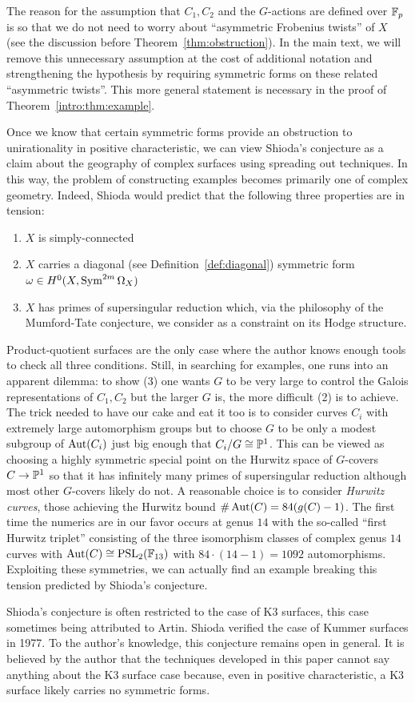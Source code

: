 \documentclass[main.tex]{subfiles}
\begin{document}
The reason for the assumption that $C_1, C_2$ and the $G$-actions are defined over $\FF_p$ is so that we do not need to worry about ``asymmetric Frobenius twists'' of $X$ (see the discussion before Theorem~\ref{thm:obstruction}). In the main text, we will remove this unnecessary assumption at the cost of additional notation and strengthening the hypothesis by requiring symmetric forms on these related ``asymmetric twists''. This more general statement is necessary in the proof of Theorem~\ref{intro:thm:example}.
\par 
Once we know that certain symmetric forms provide an obstruction to unirationality in positive characteristic, we can view Shioda's conjecture as a claim about the geography of complex surfaces using spreading out techniques. In this way, the problem of constructing examples becomes primarily one of complex geometry. Indeed, Shioda would predict that the following three properties are in tension:
\begin{enumerate}
    \item $X$ is simply-connected
    \item $X$ carries a diagonal (see Definition~\ref{def:diagonal}) symmetric form $\omega \in H^0(X, \Sym^{2m}{\Omega_X})$
    \item $X$ has primes of supersingular reduction which, via the philosophy of the Mumford-Tate conjecture, we consider as a constraint on its Hodge structure.
\end{enumerate}
Product-quotient surfaces are the only case where the author knows enough tools to check all three conditions. Still, in searching for examples, one runs into an apparent dilemma: to show (3) one wants $G$ to be very large to control the Galois representations of $C_1, C_2$ but the larger $G$ is, the more difficult (2) is to achieve. The trick needed to have our cake and eat it too is to consider curves $C_i$ with extremely large automorphism groups but to choose $G$ to be only a modest subgroup of $\Aut(C_i)$ just big enough that $C_i / G \cong \P^1$. This can be viewed as choosing a highly symmetric special point on the Hurwitz space of $G$-covers $C \to \P^1$ so that it has infinitely many primes of supersingular reduction although most other $G$-covers likely do not. A reasonable choice is to consider \textit{Hurwitz curves}, those achieving the Hurwitz bound $\# \Aut(C) = 84(g(C)-1)$. The first time the numerics are in our favor occurs at genus $14$ with the so-called ``first Hurwitz triplet'' consisting of the three isomorphism classes of complex genus $14$ curves with $\Aut(C) \cong \PSL_2(\FF_{13})$ with $84 \cdot (14 - 1) = 1092$ automorphisms. Exploiting these symmetries, we can actually find an example breaking this tension predicted by Shioda's conjecture.
\par
Shioda's conjecture is often restricted to the case of K3 surfaces, this case sometimes being attributed to Artin. Shioda verified the case of Kummer surfaces \cite{shioda:unirational} in 1977. To the author's knowledge, this conjecture remains open in general. It is believed by the author that the techniques developed in this paper cannot say anything about the K3 surface case because, even in positive characteristic, a K3 surface likely carries no symmetric forms.
\end{document}

